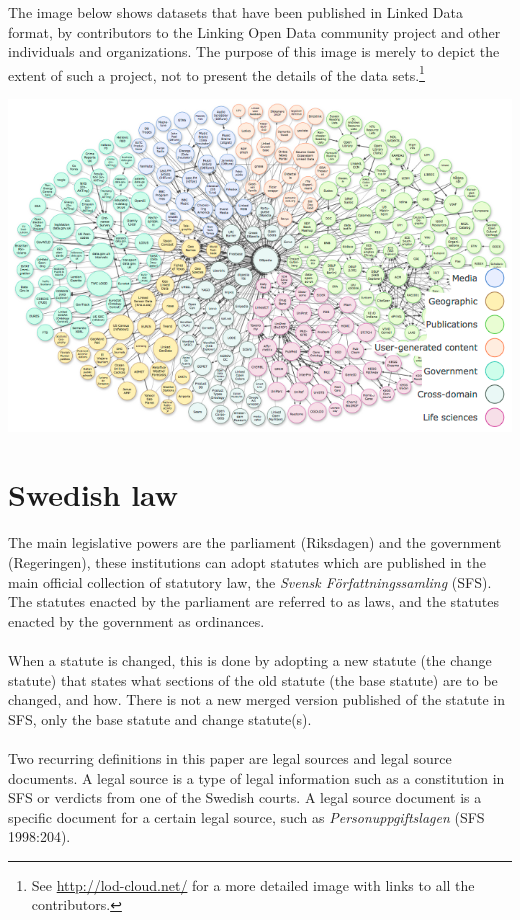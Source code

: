 The image below shows datasets that have been published in Linked Data format, by contributors to the Linking Open Data community project and other individuals and organizations. The purpose of this image is merely to depict the extent of such a project, not to present the details of the data sets.\footnote{See \url{http://lod-cloud.net/} for a more detailed image with links to all the contributors.}
\begin{center}
\includegraphics[scale=0.6]{../imgs/lod-datasets.png}
\end{center}

\section{Swedish law}
The main legislative powers are the parliament (Riksdagen) and the government (Regeringen), these institutions can adopt statutes which are published in the main official collection of statutory law, the \textit{Svensk Författningssamling} (SFS). The statutes enacted by the parliament are referred to as laws, and the statutes enacted by the government as ordinances.\\\\
When a statute is changed, this is done by adopting a new statute (the change statute) that states what sections of the old statute (the base statute) are to be changed, and how. There is not a new merged version published of the statute in SFS, only the base statute and change statute(s).\\\\
Two recurring definitions in this paper are legal sources and legal source documents. A legal source is a type of legal information such as a constitution in SFS or verdicts from one of the Swedish courts. A legal source document is a specific document for a certain legal source, such as \textit{Personuppgiftslagen} (SFS 1998:204). 
